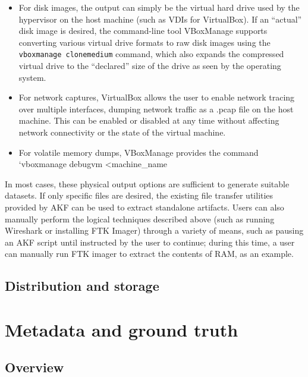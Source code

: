 \begin{itemize}
\tightlist
\item
  For disk images, the output can simply be the virtual hard drive used
  by the hypervisor on the host machine (such as VDIs for VirtualBox).
  If an ``actual'' disk image is desired, the command-line tool
  VBoxManage supports converting various virtual drive formats to raw
  disk images using the \passthrough{\lstinline!vboxmanage clonemedium!}
  command, which also expands the compressed virtual drive to the
  ``declared'' size of the drive as seen by the operating system.\\
\item
  For network captures, VirtualBox allows the user to enable network
  tracing over multiple interfaces, dumping network traffic as a .pcap
  file on the host machine. This can be enabled or disabled at any time
  without affecting network connectivity or the state of the virtual
  machine.\\
\item
  For volatile memory dumps, VBoxManage provides the command `vboxmanage
  debugvm \textless machine\_name
\end{itemize}

In most cases, these physical output options are sufficient to generate
suitable datasets. If only specific files are desired, the existing file
transfer utilities provided by AKF can be used to extract standalone
artifacts. Users can also manually perform the logical techniques
described above (such as running Wireshark or installing FTK Imager)
through a variety of means, such as pausing an AKF script until
instructed by the user to continue; during this time, a user can
manually run FTK imager to extract the contents of RAM, as an example.

\subsection{Distribution and
storage}\label{distribution-and-storage}

\section{Metadata and ground
truth}\label{metadata-and-ground-truth}

\subsection{Overview}\label{overview-1}

